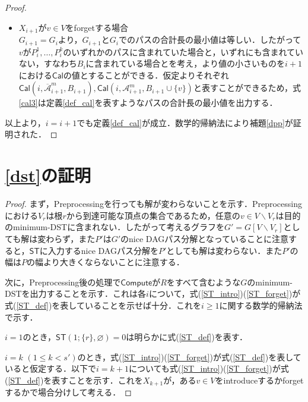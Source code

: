 \documentclass[master]{kuisthesis}		%
\theoremstyle{plain}
\theoremstyle{definition}
\begin{document}
{\begin{proof}
\begin{itemize}
        \item $X_{i+1}$が$v \in V$をforgetする場合 \\
        $G_{i+1} = G_i$より，$G_{i+1}$と$G_i$でのパスの合計長の最小値は等しい．したがって$v$が$P^1_i, \dots , P^k_i$のいずれかのパスに含まれていた場合と，いずれにも含まれていない，すなわち$B_i$に含まれている場合とを考え，より値の小さいものを$i+1$における$\mathsf{Cal}$の値とすることができる．仮定よりそれぞれ$\mathsf{Cal}(i, \mathscr{\overline{A}}^m_{i+1}, B_{i+1}),\mathsf{Cal}(i, \mathscr{A}^m_{i+1}, B_{i+1} \cup \{v\})$と表すことができるため，式\ref{cal3}は定義\ref{def_cal}を表すようなパスの合計長の最小値を出力する．
    \end{itemize}
    以上より，$i = i+1$でも定義\ref{def_cal}が成立．数学的帰納法により補題\ref{dpp}が証明された．
\end{proof}







\section{\ref{dst}の証明}

\begin{proof}
    まず，Preprocessingを行っても解が変わらないことを示す．Preprocessingにおける$V_r$は根$r$から到達可能な頂点の集合であるため，任意の$v \in V \backslash V_r$は目的のminimum-DSTに含まれない．したがって考えるグラフを$G' = G[V \backslash V_r]$としても解は変わらず，また$P'$は$G'$のnice DAGパス分解となっていることに注意すると，$\mathsf{ST}$に入力するnice DAGパス分解を$P'$としても解は変わらない．また$P'$の幅は$P$の幅より大きくならないことに注意する．

    次に，Preprocessing後の処理で$\mathsf{Compute}$が$R$をすべて含むような$G$のminimum-DSTを出力することを示す．これは各$i$について，式(\ref{ST_intro})(\ref{ST_forget})が式(\ref{ST_def})を表していることを示せば十分．これを$i \geq 1$に関する数学的帰納法で示す．    
 
    
    $i=1$のとき，$\mathsf{ST}(1; \{r\}, \varnothing) = 0$は明らかに式(\ref{ST_def})を表す．
    
    $i=k$ $(1 \leq k < s')$のとき，式(\ref{ST_intro})(\ref{ST_forget})が式(\ref{ST_def})を表していると仮定する．以下で$i = k+1$についても式(\ref{ST_intro})(\ref{ST_forget})が式(\ref{ST_def})を表すことを示す．これを$X_{k+1}$が，ある$v \in V$をintroduceするかforgetするかで場合分けして考える．


\end{proof}}
\end{document}
